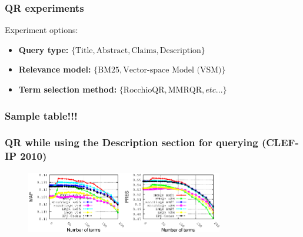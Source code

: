 \documentclass[xcolor=x11names,compress]{beamer}
\renewcommand{\(}{\begin{columns}}
\renewcommand{\)}{\end{columns}}
\newcommand{\<}[1]{\begin{column}{#1}}
\renewcommand{\>}{\end{column}}
\begin{document}
\begin{frame}
\frametitle{QR experiments}

Experiment options:
\begin{itemize}
\item \textbf{\footnotesize{}Query type:}{\footnotesize{} $\{\mathrm{Title},\mathrm{Abstract},\mathrm{Claims},\mathrm{Description}\}$ }{\footnotesize \par}
\item \textbf{\footnotesize{}Relevance model:}{\footnotesize{} $\{\mathrm{BM25},\mbox{Vector-space Model (VSM)}\}$ }{\footnotesize \par}
\item \textbf{\footnotesize{}Term selection method:}{\footnotesize{} $\{\mathrm{RocchioQR},\mathrm{MMRQR},etc...\}$ }{\footnotesize \par}
\end{itemize}

\end{frame}


\begin{frame}
\frametitle{Sample table!!!}
\end{frame}


\begin{frame}
\frametitle{QR while using the Description section for querying (CLEF-IP 2010)}

\begin{center}
\begin{figure}
\begin{centering}
\includegraphics[width=4.3cm]{../mmrqrResults/qDescription-sDescription_MAP_2010}\includegraphics[width=4.3cm]{../mmrqrResults/qDescription-sDescription_PRES_2010}
\par\end{centering}
\end{figure}
\par\end{center}
\end{frame}
\end{document}
